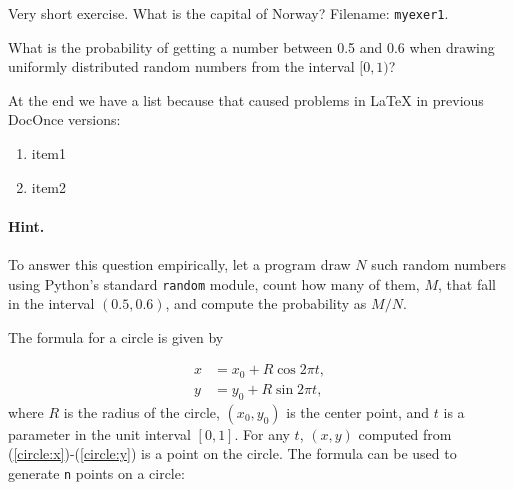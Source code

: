 \n\documentclass[%
oneside,                 %
final,                   %
10pt]{article}
\newenvironment{doconceexercise}{}{}
\newcounter{doconceexercisecounter}
\theoremstyle{definition}
\begin{document}
\begin{enumerate}
\begin{doconceexercise}
Very short exercise. What is the capital
of Norway?
\noindent Filename: \texttt{myexer1}.

\end{doconceexercise}

\begin{doconceexercise}

                             
\label{demo:ex:2}


What is the probability of getting a number between 0.5 and 0.6 when
drawing uniformly distributed random numbers from the interval $[0,1)$?

At the end we have a list because that caused problems in {\LaTeX}
in previous DocOnce versions:

\begin{enumerate}
\item item1

\item item2
\end{enumerate}

\noindent

\paragraph{Hint.}
To answer this question empirically, let a program
draw $N$ such random numbers using Python's standard \texttt{random} module,
count how many of them, $M$, that fall in the interval $(0.5,0.6)$, and
compute the probability as $M/N$.


\end{doconceexercise}

\begin{doconceexercise}

                             
\label{proj:circle1}

The formula for a circle is given by

\begin{align}
x &= x_0 + R\cos 2\pi t,
\label{circle:x}\\ 
y &= y_0 + R\sin 2\pi t,
\label{circle:y}
\end{align}
where $R$ is the radius of the circle, $(x_0,y_0)$ is the
center point, and $t$ is a parameter in the unit interval $[0,1]$.
For any $t$, $(x,y)$ computed from (\ref{circle:x})-(\ref{circle:y})
is a point on the circle.
The formula can be used to generate \texttt{n} points on a circle:












\end{doconceexercise}
\end{enumerate}
\end{document}
